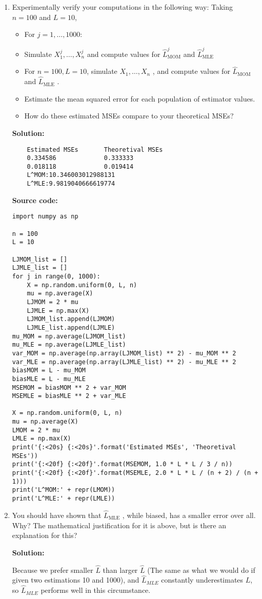 \documentclass[letter, 12pt]{article}
\begin{document}
\begin{enumerate}[wide = 0pt, label = \arabic*)]
		\item {Experimentally verify your computations in the following way: Taking $ n = 100 $ and $ L = 10 $,}
		\begin{itemize}
			\item {For $ j = 1, \dots , 1000 $:}
			\item {Simulate $ X_1^j , \dots , X_n^j $ and compute values for $ \hat{L}_{\text{MOM}}^j $ and $ \hat{L}_{\text{MLE}}^j $}
			\item {For $ n = 100, L = 10 $, simulate $ X_1 , \dots , X_n $ , and compute values for $ \hat{L}_{\text{MOM}} $ and $ \hat{L}_{\text{MLE}} $ .}
			\item {Estimate the mean squared error for each population of estimator values.}
			\item {How do these estimated MSEs compare to your theoretical MSEs?}
		\end{itemize}
		\par{\textbf{Solution:}}
		\begin{lstlisting}
	Estimated MSEs       Theoretival MSEs    
	0.334586             0.333333            
	0.018118             0.019414            
	L^MOM:10.346003012988131
	L^MLE:9.9819040666619774
		\end{lstlisting}
		\par{\textbf{Source code:}}
		\begin{verbatim}
import numpy as np

n = 100
L = 10

LJMOM_list = []
LJMLE_list = []
for j in range(0, 1000):
    X = np.random.uniform(0, L, n)
    mu = np.average(X)
    LJMOM = 2 * mu
    LJMLE = np.max(X)
    LJMOM_list.append(LJMOM)
    LJMLE_list.append(LJMLE)
mu_MOM = np.average(LJMOM_list)
mu_MLE = np.average(LJMLE_list)
var_MOM = np.average(np.array(LJMOM_list) ** 2) - mu_MOM ** 2
var_MLE = np.average(np.array(LJMLE_list) ** 2) - mu_MLE ** 2
biasMOM = L - mu_MOM
biasMLE = L - mu_MLE
MSEMOM = biasMOM ** 2 + var_MOM
MSEMLE = biasMLE ** 2 + var_MLE

X = np.random.uniform(0, L, n)
mu = np.average(X)
LMOM = 2 * mu
LMLE = np.max(X)
print('{:<20s} {:<20s}'.format('Estimated MSEs', 'Theoretival MSEs'))
print('{:<20f} {:<20f}'.format(MSEMOM, 1.0 * L * L / 3 / n))
print('{:<20f} {:<20f}'.format(MSEMLE, 2.0 * L * L / (n + 2) / (n + 1)))
print('L^MOM:' + repr(LMOM))
print('L^MLE:' + repr(LMLE))
		\end{verbatim}
	
		\item {You should have shown that $ \hat{L}_{\text{MLE}} $ , while biased, has a smaller error over all. Why? The mathematical justification for it is above, but is there an explanation for this?}
		\par{\textbf{Solution:}}
		\par{Because we prefer smaller $ \hat{L} $ than larger $ \hat{L} $ (The same as what we would do if given two estimations 10 and 1000), and $ \hat{L}_{MLE} $ constantly underestimates $ L $, so $ \hat{L}_{MLE} $ performs well in this circumstance.}
		

\end{enumerate}
\end{document}
